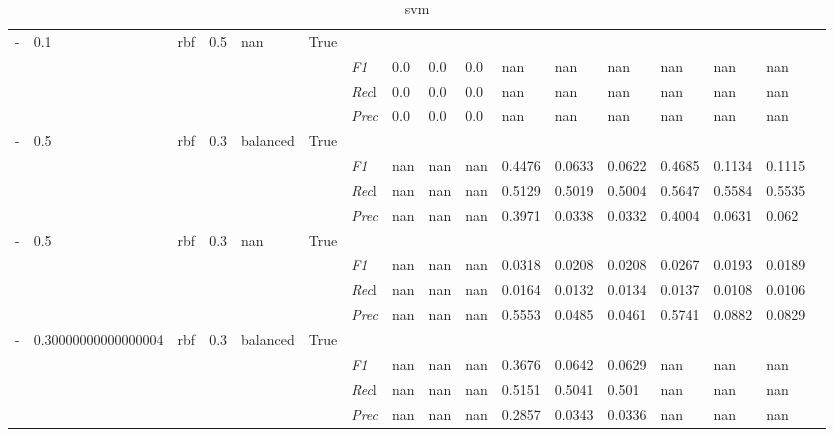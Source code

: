 \begin{table}[]
\begin{tabularx}{\textwidth}{XXXXXX|X|XXX|XXX|XXXX}
- & 0.1 & rbf & 0.5 & nan &True & & & & & & & & & \\
& & & & & & \textit{F1} & 0.0 & 0.0 & 0.0 & nan & nan        & nan        & nan        & nan        & nan        \\
& & & & & & \textit{Rec}l & 0.0 & 0.0 & 0.0    & nan & nan    & nan    & nan    & nan    & nan    \\
& & & & & & \textit{Prec} & 0.0 & 0.0 & 0.0 & nan & nan & nan & nan & nan & nan \\ \midrule
- & 0.5 & rbf & 0.3 & balanced &True & & & & & & & & & \\
& & & & & & \textit{F1} & nan & nan & nan & 0.4476 & 0.0633        & 0.0622        & 0.4685        & 0.1134        & 0.1115        \\
& & & & & & \textit{Rec}l & nan & nan & nan    & 0.5129 & 0.5019    & 0.5004    & 0.5647    & 0.5584    & 0.5535    \\
& & & & & & \textit{Prec} & nan & nan & nan & 0.3971 & 0.0338 & 0.0332 & 0.4004 & 0.0631 & 0.062 \\ \midrule
- & 0.5 & rbf & 0.3 & nan &True & & & & & & & & & \\
& & & & & & \textit{F1} & nan & nan & nan & 0.0318 & 0.0208        & 0.0208        & 0.0267        & 0.0193        & 0.0189        \\
& & & & & & \textit{Rec}l & nan & nan & nan    & 0.0164 & 0.0132    & 0.0134    & 0.0137    & 0.0108    & 0.0106    \\
& & & & & & \textit{Prec} & nan & nan & nan & 0.5553 & 0.0485 & 0.0461 & 0.5741 & 0.0882 & 0.0829 \\ \midrule
- & 0.30000000000000004 & rbf & 0.3 & balanced &True & & & & & & & & & \\
& & & & & & \textit{F1} & nan & nan & nan & 0.3676 & 0.0642        & 0.0629        & nan        & nan        & nan        \\
& & & & & & \textit{Rec}l & nan & nan & nan    & 0.5151 & 0.5041    & 0.501    & nan    & nan    & nan    \\
& & & & & & \textit{Prec} & nan & nan & nan & 0.2857 & 0.0343 & 0.0336 & nan & nan & nan \\ \midrule
\end{tabularx}
\caption{svm}
\label{tab:all_results_svm}
\end{table}